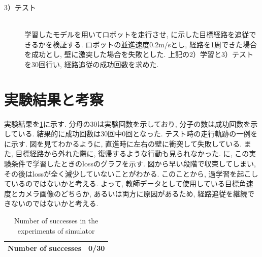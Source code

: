 \begin{description}
  \item[3）テスト]\mbox{}\\ \hspace*{3mm}学習したモデルを用いてロボットを走行させ, に示した目標経路を追従できるかを検証する. ロボットの並進速度0.2m/sとし, 経路を1周できた場合を成功とし, 壁に激突した場合を失敗とした. 上記の2）学習と3）テストを30回行い, 経路追従の成功回数を求めた. 
\end{description}

\section{実験結果と考察}
実験結果を\ref{tb:exp2}に示す. 分母の30は実験回数を示しており, 分子の数は成功回数を示している. 結果的に成功回数は30回中0回となった. テスト時の走行軌跡の一例をに示す. 図を見てわかるように, 直進時に左右の壁に衝突して失敗している. また, 目標経路から外れた際に, 復帰するような行動も見られなかった. に, この実験条件で学習したときのlossのグラフを示す. 図から早い段階で収束してしまい, その後はlossが全く減少していないことがわかる. このことから, 過学習を起こしているのではないかと考える. よって, 教師データとして使用している目標角速度とカメラ画像のどちらか, あるいは両方に原因があるため, 経路追従を継続できないのではないかと考える. 

\begin{table}[h]
  \centering
  \caption{Number of successes in the experiments of simulator}
  \begin{tabular}{|c|c|} \hline
      Number of successes & 0/30 \\ \hline
    \end{tabular}
  \label{tb:exp2}
\end{table}


